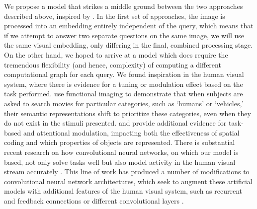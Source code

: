We propose a model that strikes a middle ground between the two approaches described above, inspired by \textcite{Mozer2008}. In the first set of approaches, the image is processed into an embedding entirely independent of the query, which means that if we attempt to answer two separate questions on the same image, we will use the same visual embedding, only differing in the final, combined processing stage. On the other hand, we hoped to arrive at a model which does require the tremendous flexibility (and hence, complexity) of computing a different computational graph for each query. We found inspiration in the human visual system, where there is evidence for a tuning or modulation effect based on the task performed. \textcite{Cukur2013} use functional imaging to demonstrate that when subjects are asked to search movies for particular categories, such as `humans' or `vehicles,' their semantic representations shift to prioritize these categories, even when they do not exist in the stimuli presented. \textcite{Kay2015} and \textcite{Bracci2017} provide additional evidence for task-based and attentional modulation, impacting both the effectiveness of spatial coding and which properties of objects are represented. There is substantial recent research on how convolutional neural networks, on which our model is based, not only solve tasks well but also model activity in the human visual stream accurately \parencite{Yamins2016}. This line of work has produced a number of modifications to convolutional neural network architectures, which seek to augment these artificial models with additional features of the human visual system, such as recurrent and feedback connections \parencite{Spoerer2017,Nayebi2018} or different convolutional layers \parencite{Kubilius2018}. 

